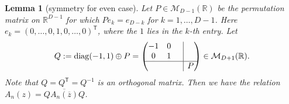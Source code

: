 \documentclass[pdftex]{sigma}
\numberwithin{equation}{section}
\newtheorem{Lemma}[Theorem]{Lemma}
\newcommand*{\bord}{\multicolumn{1}{c|}{}}
\begin{document}
\begin{Lemma}[symmetry for even case]\label{EvenSymmetry} Let $P \in \mathcal{M}_{D-1}(\mathbb{R})$ be the permutation matrix on $\mathbb{R}^{D-1}$ for which $P e_k = e_{D-k}$ for $k = 1, \dots, D-1$. Here $e_k = (0, \dots, 0, 1, 0, \dots, 0)^\mathsf{T}$, where the $1$ lies in the $k$-th entry. Let
\begin{equation*}
Q := \mathrm{diag}(-1,1) \oplus P = \left( \begin{matrix} -1 & 0 & \bord & \\
0 & 1 & \bord &\\ \hline
& & \bord & P\end{matrix} \right) \in \mathcal{M}_{D+1}(\mathbb{R}).
\end{equation*}
Note that $Q = Q^\mathsf{T} = Q^{-1}$ is an orthogonal matrix. Then we have the relation $
A_{n}(z) = Q \overline{A_{n}(\overline{z}) } Q$.
\end{Lemma}
\end{document}
